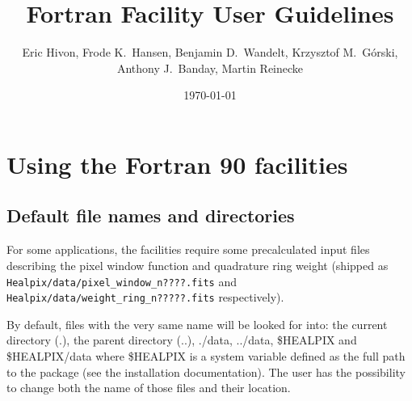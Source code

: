 \documentclass[12pt,twoside]{article}
\begin{document}
\title{\healpix Fortran Facility User Guidelines}
\label{fac:facilities}
\author{Eric Hivon, Frode K.~Hansen, Benjamin D.~Wandelt, Krzysztof M.~G\'orski,
Anthony J.~Banday, Martin Reinecke}

\date{\today}

\frontpage
\tableofcontents
\newpage

\section{Using the \healpix Fortran 90 facilities}
\subsection{Default file names and directories}
\label{fac:subsec:defdir}
For some applications, the \healpix facilities
require some precalculated input files describing the pixel window
function and quadrature ring weight (shipped as {\tt
Healpix/data/pixel\_window\_n????.fits} and {\tt
Healpix/data/weight\_ring\_n?????.fits} respectively). \label{page:defdir}

By default, files with the very same name will be looked for into: the current directory (.), the parent directory (..),
./data, ../data, \$HEALPIX and \$HEALPIX/data where \$HEALPIX is
a system variable defined as the full path to the \healpix package
(see the installation documentation).
The user has the possibility to change both the name of those files
and their location.

\end{document}
